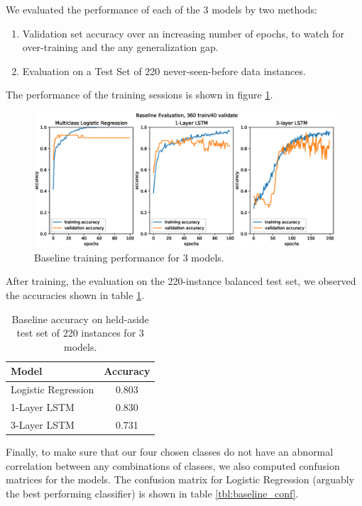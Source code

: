 \documentclass{article}
\begin{document}
We evaluated the performance of each of the 3 models by two methods:
\begin{enumerate}
\item Validation set accuracy over an increasing number of epochs, to watch for over-training and the any generalization gap.
\item Evaluation on a Test Set of 220 never-seen-before data instances.
\end{enumerate}

The performance of the training sessions is shown in figure \ref{fig:baseline_train}.
\begin{figure}[]
	\centering
	\includegraphics[width=1.25\textwidth]{Baseline400.eps}  
	\caption{Baseline training performance for 3 models.}
	\label{fig:baseline_train}
\end{figure}

After training, the evaluation on  the 220-instance balanced test set, we observed the accuracies shown in table \ref{tbl:baseline_acc}.
\begin{table}[] 
\caption{Baseline accuracy on held-aside test set of 220 instances for 3 models.}
\label{tbl:baseline_acc}
\centering
\begin{tabular}{lc} 
\toprule
\hline
Model & Accuracy \\ 
\midrule
Logistic Regression & 0.803 \\
1-Layer LSTM & 0.830 \\ 
3-Layer LSTM & 0.731 \\ 
\bottomrule
\end{tabular}
\end{table}

Finally, to make sure that our four chosen classes do not have an abnormal correlation between any combinations of classes, we also computed confusion matrices for the models. The confusion matrix for Logistic Regression (arguably the best performing classifier) is shown in table \ref{tbl:baseline_conf}.
\end{document}
